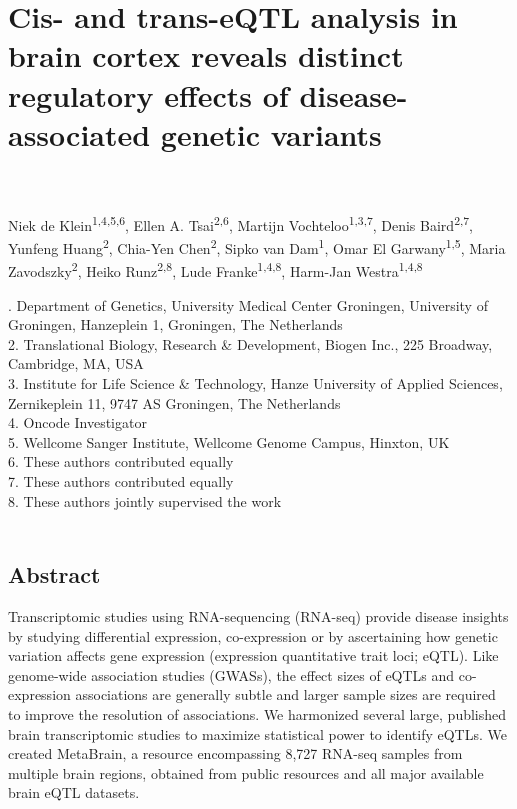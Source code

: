 \chapter[Cis- and trans-eQTL analysis in brain cortex reveals distinct regulatory effects of disease-associated genetic variants]{Cis- and trans-eQTL analysis in brain cortex reveals distinct regulatory effects of disease-associated genetic variants}

\label{chap:chapter5-brain}


\noindent
\\
\\

Niek de Klein\textsuperscript{1,4,5,6}, Ellen A. Tsai\textsuperscript{2,6}, Martijn Vochteloo\textsuperscript{1,3,7}, Denis Baird\textsuperscript{2,7}, Yunfeng Huang\textsuperscript{2}, Chia-Yen Chen\textsuperscript{2}, Sipko van Dam\textsuperscript{1}, Omar El Garwany\textsuperscript{1,5}, Maria Zavodszky\textsuperscript{2}, Heiko Runz\textsuperscript{2,8}, Lude Franke\textsuperscript{1,4,8}, Harm-Jan Westra\textsuperscript{1,4,8}






. Department of Genetics, University Medical Center Groningen, University of Groningen, Hanzeplein 1, Groningen, The Netherlands \\
2. Translational Biology, Research \& Development, Biogen Inc., 225 Broadway, Cambridge, MA, USA \\
3. Institute for Life Science \& Technology, Hanze University of Applied Sciences, Zernikeplein 11, 9747 AS Groningen, The Netherlands \\
4. Oncode Investigator \\
5. Wellcome Sanger Institute, Wellcome Genome Campus, Hinxton, UK \\
6. These authors contributed equally \\
7. These authors contributed equally \\
8. These authors jointly supervised the work 
\\
\\

\newpage

\section*{Abstract}
Transcriptomic studies using RNA-sequencing (RNA-seq) provide disease insights by studying differential expression, co-expression or by ascertaining how genetic variation affects gene expression (expression quantitative trait loci; eQTL). Like genome-wide association studies (GWASs), the effect sizes of eQTLs and co-expression associations are generally subtle and larger sample sizes are required to improve the resolution of associations. We harmonized several large, published brain transcriptomic studies to maximize statistical power to identify eQTLs. We created MetaBrain, a resource encompassing 8,727 RNA-seq samples from multiple brain regions, obtained from public resources and all major available brain eQTL datasets.  

